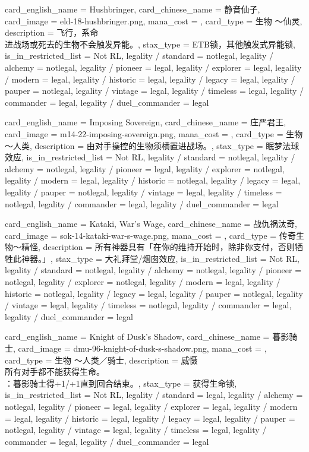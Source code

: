 \documentclass[lang = cn, color = black, 10pt]{AllThatStax}
\begin{document}
\card
{
	card_english_name = {Hushbringer},
	card_chinese_name = {静音仙子},
	card_image = eld-18-hushbringer.png,
	mana_cost = ,
	card_type = 生物 ～仙灵,
	description = {飞行，系命\\
		进战场或死去的生物不会触发异能。},
	stax_type = ETB锁，其他触发式异能锁,
	is_in_restricted_list = Not RL,
	legality / standard = notlegal,
	legality / alchemy = notlegal,
	legality / pioneer = legal,
	legality / explorer = legal,
	legality / modern = legal,
	legality / historic = legal,
	legality / legacy = legal,
	legality / pauper = notlegal,
	legality / vintage = legal,
	legality / timeless = legal,
	legality / commander = legal,
	legality / duel_commander = legal
}

\card
{
	card_english_name = {Imposing Sovereign},
	card_chinese_name = {庄严君王},
	card_image = m14-22-imposing-sovereign.png,
	mana_cost = ,
	card_type = 生物～人类,
	description = {由对手操控的生物须横置进战场。},
	stax_type = 眠梦法球效应,
	is_in_restricted_list = Not RL,
	legality / standard = notlegal,
	legality / alchemy = notlegal,
	legality / pioneer = legal,
	legality / explorer = notlegal,
	legality / modern = legal,
	legality / historic = notlegal,
	legality / legacy = legal,
	legality / pauper = notlegal,
	legality / vintage = legal,
	legality / timeless = notlegal,
	legality / commander = legal,
	legality / duel_commander = legal
}

\card
{
	card_english_name = {Kataki, War's Wage},
	card_chinese_name = {战仇祸汰奇},
	card_image = sok-14-kataki-war-s-wage.png,
	mana_cost = ,
	card_type = 传奇生物～精怪,
	description = {所有神器具有「在你的维持开始时，除非你支付，否则牺牲此神器。」},
	stax_type = 大礼拜堂/烟囱效应,
	is_in_restricted_list = Not RL,
	legality / standard = notlegal,
	legality / alchemy = notlegal,
	legality / pioneer = notlegal,
	legality / explorer = notlegal,
	legality / modern = legal,
	legality / historic = notlegal,
	legality / legacy = legal,
	legality / pauper = notlegal,
	legality / vintage = legal,
	legality / timeless = notlegal,
	legality / commander = legal,
	legality / duel_commander = legal
}

\card
{
	card_english_name = {Knight of Dusk's Shadow},
	card_chinese_name = {暮影骑士},
	card_image = dmu-96-knight-of-dusk-s-shadow.png,
	mana_cost = ,
	card_type = 生物 ～人类／骑士,
	description = {威慑\\
		所有对手都不能获得生命。\\
		：暮影骑士得+1/+1直到回合结束。},
	stax_type = 获得生命锁,
	is_in_restricted_list = Not RL,
	legality / standard = legal,
	legality / alchemy = notlegal,
	legality / pioneer = legal,
	legality / explorer = legal,
	legality / modern = legal,
	legality / historic = legal,
	legality / legacy = legal,
	legality / pauper = notlegal,
	legality / vintage = legal,
	legality / timeless = legal,
	legality / commander = legal,
	legality / duel_commander = legal
}
\end{document}
